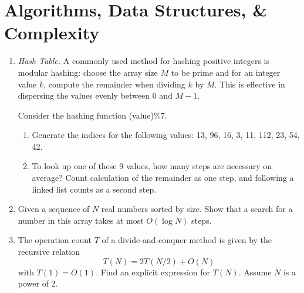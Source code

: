\documentclass{article}
\begin{document}
\section{Algorithms, Data Structures, \& Complexity}
\begin{enumerate}

\item {\it Hash Table.}  \label{prbl:hash}
A commonly used method for hashing positive integers is modular hashing: choose the array size $M$ to be prime and for an integer value $k$, compute the remainder when dividing $k$ by $M$. This is effective in dispersing the values evenly between 0 and $M-1$. 

Consider the hashing function (value)\%7. 
\vspace{-1em}
\begin{enumerate}\setlength{\itemsep}{0pt}
\item Generate the indices for the following values: 13, 96, 16, 3, 11, 112, 23, 54, 42.
\item To look up one of these 9 values, how many steps are necessary on average?  Count calculation of the remainder as one step, and following a linked list counts as a second step.
\end{enumerate}


\item \label{prbl:bisearch}
  Given a sequence of $N$ real numbers sorted by size. Show that a search for a number in this array takes at most $O(\log N)$ steps.

\item
The operation count $T$ of a divide-and-conquer method is given by the recursive relation
\[
T(N) = 2 T(N/2) + O(N)
\]
with $T(1)=O(1)$. Find an explicit expression for $T(N)$.
Assume $N$ is a power of 2.


\end{enumerate}
\end{document}

